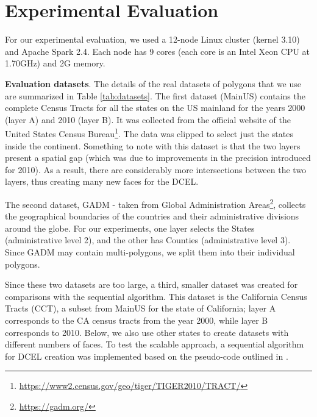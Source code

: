 \section{Experimental Evaluation} \label{sec:experiments}

For our experimental evaluation, we used a 12-node Linux cluster (kernel 3.10) and Apache Spark 2.4. Each node has 9 cores (each core is an Intel Xeon CPU at 1.70GHz) and 2G memory.

\textbf{Evaluation datasets}.
The details of the real datasets of polygons that we use are summarized in Table \ref{tab:datasets}. The first dataset (MainUS) contains the complete Census Tracts for all the states on the US mainland for the years 2000 (layer A) and 2010 (layer B). It was collected from the official website of the United States Census Bureau\footnote{\url{https://www2.census.gov/geo/tiger/TIGER2010/TRACT/}}. The data was clipped to select just the states inside the continent. Something to note with this dataset is that the two layers present a spatial gap (which was due to improvements in the precision introduced for 2010). As a result, there are considerably more intersections between the two layers, thus creating many new faces for the DCEL.

The second dataset, GADM - taken from Global Administration Areas\footnote{\url{https://gadm.org/}}, collects the geographical boundaries of the countries and their administrative divisions around the globe. For our experiments, one layer selects the States (administrative level 2), and the other has Counties (administrative level 3). Since GADM may contain multi-polygons, we split them into their individual polygons. 

Since these two datasets are too large, a third, smaller dataset was created for comparisons with the sequential algorithm. This dataset is the California Census Tracts (CCT), a subset from MainUS for the state of California; layer A corresponds to the CA census tracts from the year 2000, while layer B corresponds to 2010. Below, we also use other states to create datasets with different numbers of faces.  
To test the scalable approach, a sequential algorithm for DCEL creation was implemented based on the pseudo-code outlined in \cite{berg_computational_2008}.

